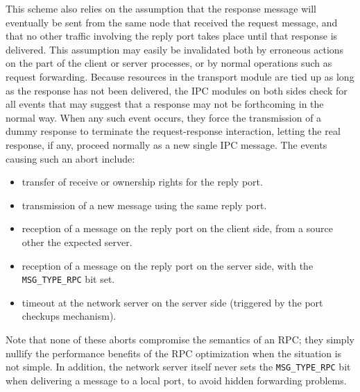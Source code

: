 This scheme also relies on the assumption that the response message
will eventually be sent from the same node that received the request
message, and that no other traffic involving the reply port takes
place until that response is delivered. This assumption may easily be
invalidated both by erroneous actions on the part of the client or
server processes, or by normal operations such as request forwarding.
Because resources in the transport module are tied up as long as the
response has not been delivered, the IPC modules on both sides check
for all events that may suggest that a response may not be forthcoming
in the normal way. When any such event occurs, they force the
transmission of a dummy response to terminate the request-response
interaction, letting the real response, if any, proceed normally as a
new single IPC message. The events causing such an abort include:
\begin{itemize}
\item transfer of receive or ownership rights for the reply port.

\item transmission of a new message using the same reply port.

\item reception of a message on the reply port on the client side,
from a source other the expected server.

\item reception of a message on the reply port on the server side, with the
\verb"MSG_TYPE_RPC" bit set.

\item timeout at the network server on the server side (triggered by
the port checkups mechanism).
\end{itemize}

Note that none of these aborts compromise the semantics of an RPC;
they simply nullify the performance benefits of the RPC optimization
when the situation is not simple. In addition, the network server
itself never sets the \verb"MSG_TYPE_RPC" bit when delivering a
message to a local port, to avoid hidden forwarding problems.

